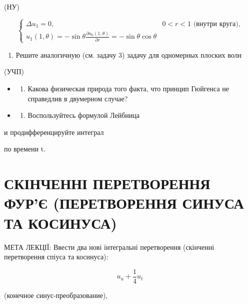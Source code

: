 \documentclass[
  ukrainian,
]{article}
\providecommand{\tightlist}{%
  \setlength{\itemsep}{0pt}\setlength{\parskip}{0pt}}
\begin{document}
(НУ)

\[
\begin{cases} \Delta u_{1} = 0, & 0 < r < 1 \text{ (внутри круга),} \\ u_{1}(1, \theta) = -\sin \theta \frac{\partial u_{0}(1, \theta)}{\partial r} = -\sin \theta \cos \theta \end{cases}
\]

\begin{enumerate}
\def\labelenumi{\arabic{enumi}.}
\setcounter{enumi}{4}
\tightlist
\item
  Решите аналогичную (см. задачу 3) задачу для одномерных плоских волн
\end{enumerate}

(УЧП)

\begin{itemize}
\tightlist
\item
  \begin{enumerate}
  \def\labelenumi{\arabic{enumi}.}
  \setcounter{enumi}{5}
  \tightlist
  \item
    Какова физическая природа того факта, что принцип Гюйгенса не
    справедлив в двумерном случае?
  \end{enumerate}
\item
  \begin{enumerate}
  \def\labelenumi{\arabic{enumi}.}
  \setcounter{enumi}{6}
  \tightlist
  \item
    Воспользуйтесь формулой Лейбница
  \end{enumerate}
\end{itemize}

и продифференцируйте интеграл

по времени t.

\section{СКІНЧЕННІ ПЕРЕТВОРЕННЯ ФУР'Є (ПЕРЕТВОРЕННЯ СИНУСА ТА
КОСИНУСА)}\label{ux441ux43aux456ux43dux447ux435ux43dux43dux456-ux43fux435ux440ux435ux442ux432ux43eux440ux435ux43dux43dux44f-ux444ux443ux440ux454-ux43fux435ux440ux435ux442ux432ux43eux440ux435ux43dux43dux44f-ux441ux438ux43dux443ux441ux430-ux442ux430-ux43aux43eux441ux438ux43dux443ux441ux430}

МЕТА ЛЕКЦІЇ: Ввести два нові інтегральні перетворення (скінченні
перетворення спіуса та косинуса):

\[
u_u + \frac{1}{4} u_t
\]

(конечное синус-преобразование),
\end{document}
